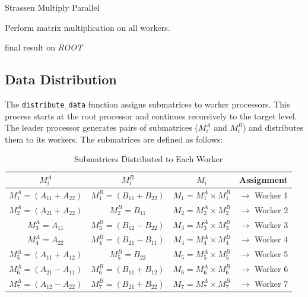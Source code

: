 \documentclass[12pt,a4paper]{article}
\begin{document}
 
\begin{algorithm}[htbp]
    \caption{Strassen Multiply Parallel}
    \label{alg:strassen_multiply_parallel}
    \begin{algorithmic}[1]

            \State {}  
        \EndFor
        
        \State Perform matrix multiplication on all workers.
        
            \State {}
        \EndFor
        
        \State \Return final result on \textit{ROOT}
    \EndProcedure
    \end{algorithmic}
\end{algorithm}

\subsection{Data Distribution}
The \texttt{distribute\_data} function assigns submatrices to worker processors. This process starts at the root processor and continues recursively to the target level. The leader processor generates pairs of submatrices ($M^A_i$ and $M^B_i$) and distributes them to its workers. The submatrices are defined as follows:

\begin{table}[htbp]
    \centering
    \begin{tabular}{cccc}
        \toprule
        $M^A_i$ & $M^B_i$ & $M_i$ & Assignment \\
        \midrule
        $M^A_1 = (A_{11} + A_{22})$ & $M^B_1 = (B_{11} + B_{22})$ & $M_1 = M^A_1 \times M^B_1$ & $\rightarrow$ Worker 1 \\
        $M^A_2 = (A_{21} + A_{22})$ & $M^B_2 = B_{11}$ & $M_2 = M^A_2 \times M^B_2$ & $\rightarrow$ Worker 2 \\
        $M^A_3 = A_{11}$ & $M^B_3 = (B_{12} - B_{22})$ & $M_3 = M^A_3 \times M^B_3$ & $\rightarrow$ Worker 3 \\
        $M^A_4 = A_{22}$ & $M^B_4 = (B_{21} - B_{11})$ & $M_4 = M^A_4 \times M^B_4$ & $\rightarrow$ Worker 4 \\
        $M^A_5 = (A_{11} + A_{12})$ & $M^B_5 = B_{22}$ & $M_5 = M^A_5 \times M^B_5$ & $\rightarrow$ Worker 5 \\
        $M^A_6 = (A_{21} - A_{11})$ & $M^B_6 = (B_{11} + B_{12})$ & $M_6 = M^A_6 \times M^B_6$ & $\rightarrow$ Worker 6 \\
        $M^A_7 = (A_{12} - A_{22})$ & $M^B_7 = (B_{21} + B_{22})$ & $M_7 = M^A_7 \times M^B_7$ & $\rightarrow$ Worker 7 \\
        \bottomrule
    \end{tabular}
    \caption{Submatrices Distributed to Each Worker}
    \label{tab:submatrices}
\end{table}
\end{document}
